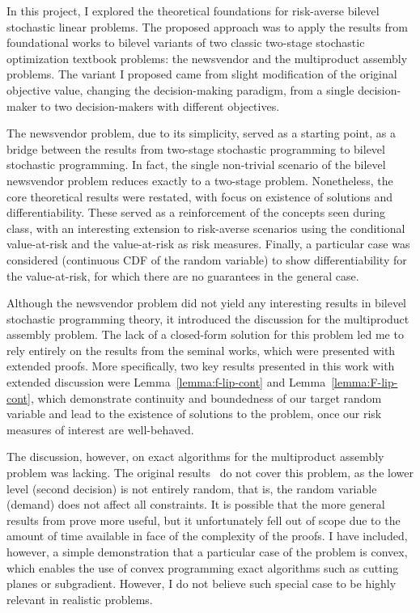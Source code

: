 \documentclass[12pt]{article}
\begin{document}
In this project, I explored the theoretical foundations for risk-averse bilevel stochastic linear problems.
The proposed approach was to apply the results from foundational works \citep{burtscheidtRiskAverseModelsBilevel2020,burtscheidtRiskAverseModelsBilevel2019} to bilevel variants of two classic two-stage stochastic optimization textbook problems: the newsvendor and the multiproduct assembly problems.
The variant I proposed came from slight modification of the original objective value, changing the decision-making paradigm, from a single decision-maker to two decision-makers with different objectives.

The newsvendor problem, due to its simplicity, served as a starting point, as a bridge between the results from two-stage stochastic programming to bilevel stochastic programming.
In fact, the single non-trivial scenario of the bilevel newsvendor problem reduces exactly to a two-stage problem.
Nonetheless, the core theoretical results were restated, with focus on existence of solutions and differentiability.
These served as a reinforcement of the concepts seen during class, with an interesting extension to risk-averse scenarios using the conditional value-at-risk and the value-at-risk as risk measures.
Finally, a particular case was considered (continuous CDF of the random variable) to show differentiability for the value-at-risk, for which there are no guarantees in the general case.

Although the newsvendor problem did not yield any interesting results in bilevel stochastic programming theory, it introduced the discussion for the multiproduct assembly problem.
The lack of a closed-form solution for this problem led me to rely entirely on the results from the seminal works, which were presented with extended proofs.
More specifically, two key results presented in this work with extended discussion were Lemma~\ref{lemma:f-lip-cont} and Lemma~\ref{lemma:F-lip-cont}, which demonstrate continuity and boundedness of our target random variable and lead to the existence of solutions to the problem, once our risk measures of interest are well-behaved.

The discussion, however, on exact algorithms for the multiproduct assembly problem was lacking.
The original results~\citep[Proposition 17.2.13]{burtscheidtRiskAverseModelsBilevel2020} do not cover this problem, as the lower level (second decision) is not entirely random, that is, the random variable (demand) does not affect all constraints.
It is possible that the more general results from \citet{burtscheidtRiskAverseModelsBilevel2019} prove more useful, but it unfortunately fell out of scope due to the amount of time available in face of the complexity of the proofs.
I have included, however, a simple demonstration that a particular case of the problem is convex, which enables the use of convex programming exact algorithms such as cutting planes or subgradient.
However, I do not believe such special case to be highly relevant in realistic problems.
\end{document}
